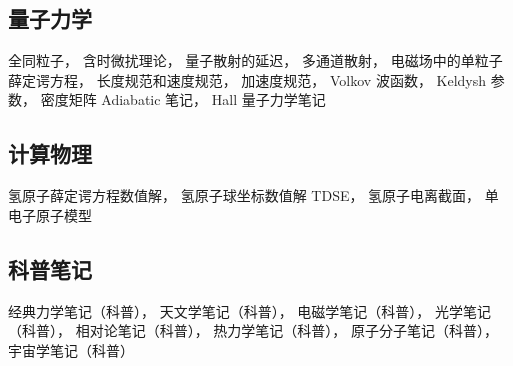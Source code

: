 \subsection{量子力学}
全同粒子， 含时微扰理论， 量子散射的延迟， 多通道散射， 电磁场中的单粒子薛定谔方程， 长度规范和速度规范， 加速度规范， Volkov 波函数， Keldysh 参数， 密度矩阵
Adiabatic 笔记，
Hall 量子力学笔记

\subsection{计算物理}
氢原子薛定谔方程数值解， 氢原子球坐标数值解 TDSE， 氢原子电离截面，  单电子原子模型

\subsection{科普笔记}
经典力学笔记（科普），
天文学笔记（科普），
电磁学笔记（科普），
光学笔记（科普），
相对论笔记（科普），
热力学笔记（科普），
原子分子笔记（科普），
宇宙学笔记（科普）

